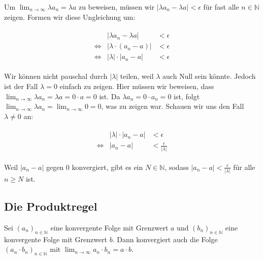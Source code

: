\documentclass[fontsize=9pt,
               parskip=half-,
               DIV=14,
               listof=chapterentry,
               tocflat]{scrbook}
\begin{document}
\begin{solutionprocess*}
Um $\lim _{n\rightarrow \infty }\lambda a_{n}=\lambda a$ zu beweisen, müssen wir $|\lambda a_{n}-\lambda a|<\epsilon $ für fast alle $n\in \mathbb {N} $ zeigen. Formen wir diese Ungleichung um:

\begin{align*}
{\begin{array}{lrl}&|\lambda a_{n}-\lambda a|&<\epsilon \\\iff {}&|\lambda \cdot (a_{n}-a)|&<\epsilon \\\iff {}&|\lambda |\cdot |a_{n}-a|&<\epsilon \end{array}}
\end{align*}

Wir können nicht pauschal durch $|\lambda |$ teilen, weil $\lambda $ auch Null sein könnte. Jedoch ist der Fall $\lambda =0$ einfach zu zeigen. Hier müssen wir beweisen, dass $\lim _{n\to \infty }\lambda a_{n}=\lambda a=0\cdot a=0$ ist. Da $\lambda a_{n}=0\cdot a_{n}=0$ ist, folgt $\lim _{n\to \infty }\lambda a_{n}=\lim _{n\to \infty }0=0$, was zu zeigen war. Schauen wir uns den Fall $\lambda \neq 0$ an:

\begin{align*}
{\begin{array}{lrl}&|\lambda |\cdot |a_{n}-a|&<\epsilon \\\iff {}&|a_{n}-a|&<{\frac {\epsilon }{|\lambda |}}\end{array}}
\end{align*}

Weil $|a_{n}-a|$ gegen $0$ konvergiert, gibt es ein $N\in \mathbb {N} $, sodass $|a_{n}-a|<{\tfrac {\epsilon }{|\lambda |}}$ für alle $n\geq N$ ist.

\end{solutionprocess*}

\subsection{Die Produktregel}

\begin{theorem*}
Sei $(a_{n})_{n\in \mathbb {N} }$ eine konvergente Folge mit Grenzwert $a$ und $(b_{n})_{n\in \mathbb {N} }$ eine konvergente Folge mit Grenzwert $b$. Dann konvergiert auch die Folge $(a_{n}\cdot b_{n})_{n\in \mathbb {N} }$ mit $\lim _{n\rightarrow \infty }a_{n}\cdot b_{n}=a\cdot b$.

\end{theorem*}
\end{document}
